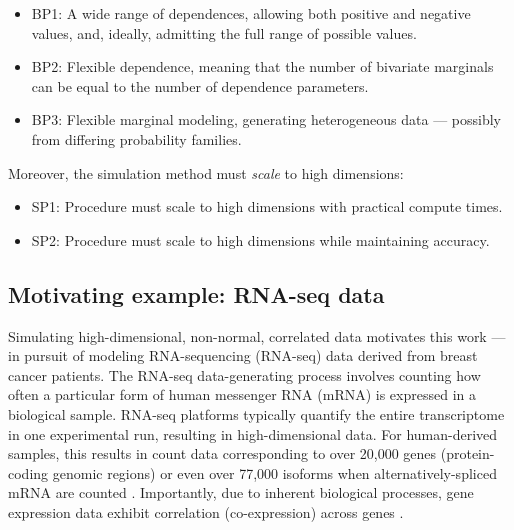 \documentclass[
]{jss}
\providecommand{\tightlist}{%
  \setlength{\itemsep}{0pt}\setlength{\parskip}{0pt}}
\begin{document}

\begin{itemize}
\tightlist
\item
  BP1: A wide range of dependences, allowing both positive and negative
  values, and, ideally, admitting the full range of possible values.
\item
  BP2: Flexible dependence, meaning that the number of bivariate
  marginals can be equal to the number of dependence parameters.
\item
  BP3: Flexible marginal modeling, generating heterogeneous data ---
  possibly from differing probability families.
\end{itemize}


Moreover, the simulation method must \emph{scale} to high dimensions:


\begin{itemize}
\tightlist
\item
  SP1: Procedure must scale to high dimensions with practical compute
  times.
\item
  SP2: Procedure must scale to high dimensions while maintaining
  accuracy.
\end{itemize}


\hypertarget{motivating-example-rna-seq-data}{%
\subsection{Motivating example: RNA-seq
data}\label{motivating-example-rna-seq-data}}

Simulating high-dimensional, non-normal, correlated data motivates this
work --- in pursuit of modeling RNA-sequencing (RNA-seq) data
\citep{Wang2009b, Conesa2016b} derived from breast cancer patients. The
RNA-seq data-generating process involves counting how often a particular
form of human messenger RNA (mRNA) is expressed in a biological sample.
RNA-seq platforms typically quantify the entire transcriptome in one
experimental run, resulting in high-dimensional data. For human-derived
samples, this results in count data corresponding to over 20,000 genes
(protein-coding genomic regions) or even over 77,000 isoforms when
alternatively-spliced mRNA are counted \citep{Schissler2019}.
Importantly, due to inherent biological processes, gene expression data
exhibit correlation (co-expression) across genes
\citep{BE07, Schissler2018}.
\end{document}
